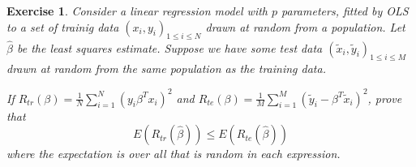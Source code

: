 \documentclass[12pt]{amsart}
\theoremstyle{plain}%
\newtheorem{exer}[thm]{Exercise}
\theoremstyle{definition}
\theoremstyle{remark}
\begin{document}
\begin{exer}
    Consider a linear regression model with $p$ parameters, fitted by OLS to a set of trainig data $(x_i, y_i)_{1 \leq i \leq N}$ drawn at random from a population.  Let $\hat \beta$ be the least squares estimate.  Suppose we have some test data $(\tilde x_i, \tilde y_i)_{1 \leq i \leq M}$ drawn at random from the same population as the training data.
    
    If $R_{tr}(\beta) = \frac{1}{N} \sum_{i=1}^N \left(y_i \beta^T x_i \right)^2$ and $R_{te}(\beta) = \frac{1}{M} \sum_{i=1}^M \left( \tilde y_i - \beta^T \tilde x_i \right)^2$, prove that \[
        E(R_{tr}(\hat \beta)) \leq E(R_{te}(\hat \beta))
    \] where the expectation is over all that is random in each expression.
\end{exer}
\end{document}
